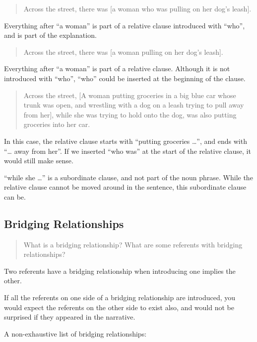 \documentclass[
]{book}
\begin{document}
\begin{quote}
Across the street,
there was {[}a woman who was pulling on her dog's leash{]}.
\end{quote}

Everything after ``a woman''
is part of a relative clause introduced with ``who'',
and is part of the explanation.

\begin{quote}
Across the street,
there was {[}a woman pulling on her dog's leash{]}.
\end{quote}

Everything after ``a woman'' is part of a relative clause.
Although it is not introduced with ``who'',
``who'' could be inserted at the beginning of the clause.

\begin{quote}
Across the street,
{[}A woman putting groceries in a big blue car whose trunk was open,
and wrestling with a dog on a leash trying to pull away from her{]},
while she was trying to hold onto the dog,
was also putting groceries into her car.
\end{quote}

In this case, the relative clause starts with ``putting groceries \ldots{}'',
and ends with ``\ldots{} away from her''.
If we inserted ``who was'' at the start of the relative clause,
it would still make sense.

``while she \ldots{}'' is a subordinate clause, and not part of the noun phrase.
While the relative clause cannot be moved around in the sentence,
this subordinate clause can be.

\hypertarget{bridging-relationships}{%
\subsection{Bridging Relationships}\label{bridging-relationships}}

\begin{quote}
What is a bridging relationship?
What are some referents with bridging relationships?
\end{quote}

Two referents have a bridging relationship
when introducing one implies the other.

If all the referents on one side of a bridging relationship are introduced,
you would expect the referents on the other side to exist also,
and would not be surprised if they appeared in the narrative.

A non-exhaustive list of bridging relationships:
\end{document}
